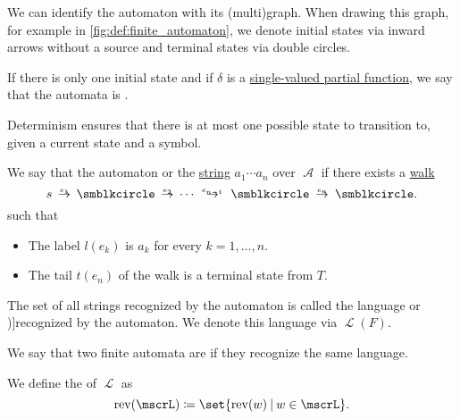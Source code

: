 \begin{definition}
\begin{thmenum}
    We can identify the automaton with its (multi)graph. When drawing this graph, for example in \cref{fig:def:finite_automaton}, we denote initial states via inward arrows without a source and terminal states via double circles.

     If there is only one initial state and if \( \delta \) is a \hyperref[def:set_valued_map/partial]{single-valued partial function}, we say that the automata is .

    Determinism ensures that there is at most one possible state to transition to, given a current state and a symbol.

     We say that the automaton  or  the \hyperref[def:formal_language/string]{string} \( a_1 \cdots a_n \) over \( \mscrA \) if there exists a \hyperref[def:graph_walk/directed]{walk}
    \begin{equation*}
      s \reloset {e_1} \to \anon \reloset {e_2} \to \cdots \reloset {e_{n-1}} \to \anon \reloset {e_n} \to \anon.
    \end{equation*}
    such that
    \begin{itemize}
      \item The label \( l(e_k) \) is \( a_k \) for every \( k = 1, \ldots, n \).
      \item The tail \( t(e_n) \) of the walk is a terminal state from \( T \).
    \end{itemize}

     The set of all strings recognized by the automaton is called the language  or \term[ru=(язык) распознается (автоматом) (\cite[45]{Гладкий1973Языки})]{recognized} by the automaton. We denote this language via \( \mscrL(F) \).

     We say that two finite automata are  if they recognize the same language.
  \end{thmenum}
\end{definition}

\begin{definition}\label{def:reverse_language}\mimprovised
  We define the  of \( \mscrL \) as
  \begin{equation*}
    \op{rev}(\mscrL) \coloneqq \set{ \op{rev}(w) \given w \in \mscrL }.
  \end{equation*}
\end{definition}

